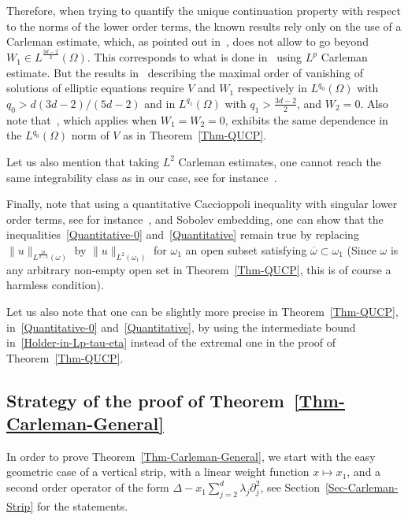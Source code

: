 \documentclass[AHL,Unicode,longabstracts]{cedram}
\begin{document}
Therefore, when trying to quantify the unique continuation property with respect to the norms of the lower order terms, the known results rely only on the use of a Carleman estimate, which, as pointed out in~\cite{barcelo1988weighted}, does not allow to go beyond $W_1 \in L^{\frac{3d-2}{2}}(\Omega)$. This corresponds to what is done in~\cite{davey2019quantitative,
davey2020quantitative} using $L^p$ Carleman estimate. But the results in~\cite{davey2019quantitative} describing the maximal order of vanishing of solutions of elliptic equations require $V$ and $W_1$ respectively in $L^{q_0}(\Omega)$ with $q_0 > d(3d-2)/(5d-2)$ and in $L^{q_1}(\Omega)$ with $q_1 > \frac{3d-2}{2}$, and $W_2=0$. Also note that~\cite[Theorem~1]{davey2020quantitative}, which applies when $W_1 = W_2 = 0$, exhibits the same dependence in the $L^{q_0}(\Omega)$ norm of $V$ as in Theorem~\ref{Thm-QUCP}.

Let us also mention that taking $L^2$ Carleman estimates, one cannot reach the same integrability class as in our case, see for instance~\cite{Duyckaerts2008}.

Finally, note that using a quantitative Caccioppoli inequality with singular lower order terms, see for instance~\cite[Lemma~5]{davey2019quantitative}, and Sobolev embedding, one can show that the inequalities~\eqref{Quantitative-0} and~\eqref{Quantitative} remain true by replacing $\|u \|_{L^{\frac{2d}{d-2}}(\omega)}$ by $\| u \|_{L^2(\omega_1)}$ for $\omega_1$ an open subset satisfying $\overline\omega \subset \omega_1$ (Since $\omega$ is any arbitrary non-empty open set in Theorem~\ref{Thm-QUCP}, this is of course a harmless condition).

Let us also note that one can be slightly more precise in Theorem~\ref{Thm-QUCP}, in~\eqref{Quantitative-0} and~\eqref{Quantitative}, by using the intermediate bound in~\eqref{Holder-in-Lp-tau-eta} instead of the extremal one in the proof of Theorem~\ref{Thm-QUCP}.


\subsection*{Strategy of the proof of Theorem~\ref{Thm-Carleman-General}}

In order to prove Theorem~\ref{Thm-Carleman-General}, we start with the easy geometric case of a vertical strip, with a linear weight function $x \mapsto x_1$, and a second order operator of the form $\Delta - x_1 \sum_{j = 2}^d \lambda_j \partial_{j}^2$, see Section~\ref{Sec-Carleman-Strip} for the statements.
\end{document}
